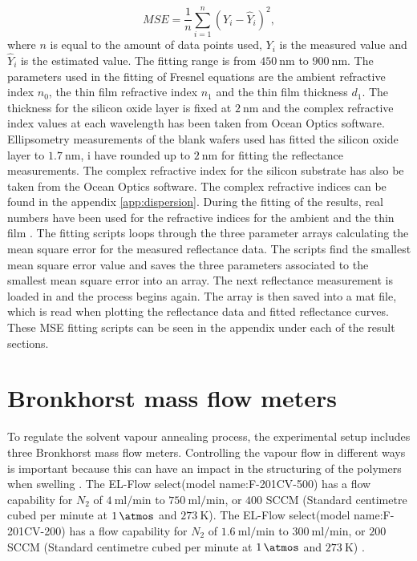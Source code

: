 \documentclass[MasterThesisMain.tex]{subfiles}
\begin{document}
\begin{equation}
MSE = \frac{1}{n}\sum_{i=1}^{n}\left( Y_i - \hat{Y}_i \right)^2,
\end{equation} 
where $n$ is equal to the amount of data points used, $Y_i$ is the measured value and $\hat{Y}_i$ is the estimated value. The fitting range is from $\SI{450}{\nano\meter}$ to $\SI{900}{\nano\meter}$. The parameters used in the fitting of Fresnel equations are the ambient refractive index $n_0$, the thin film refractive index $n_1$ and the thin film thickness $d_1$. The thickness for the silicon oxide layer is fixed at $\SI{2}{\nano\meter}$ and the complex refractive index values at each wavelength has been taken from Ocean Optics software. Ellipsometry measurements of the blank wafers used has fitted the silicon oxide layer to $\SI{1.7}{\nano\meter}$, i have rounded up to $\SI{2}{\nano\meter}$ for fitting the reflectance measurements. The complex refractive index for the silicon substrate has also be taken from the Ocean Optics software. The complex refractive indices can be found in the appendix \ref{app:dispersion}. During the fitting of the results, real numbers have been used for the refractive indices for the ambient and the thin film . The fitting scripts loops through the three parameter arrays calculating the mean square error for the measured reflectance data. The scripts find the smallest mean square error value and saves the three parameters associated to the smallest mean square error into an array. The next reflectance measurement is loaded in and the process begins again. The array is then saved into a mat file, which is read when plotting the reflectance data and fitted reflectance curves. These MSE fitting scripts can be seen in the appendix under each of the result sections.

\section{Bronkhorst mass flow meters}
To regulate the solvent vapour annealing process, the experimental setup includes three Bronkhorst mass flow meters. Controlling the vapour flow in different ways is important because this can have an impact in the structuring of the polymers when swelling \cite{SVABCP}. The EL-Flow select(model name:F-201CV-500) has a flow capability for $N_2$ of $\SI{4}{\milli\litre\per\minute}$ to $\SI{750}{\milli\litre\per\minute}$, or $400$ SCCM (Standard centimetre cubed per minute at $\SI{1}{\atmos}$ and $\SI{273}{\kelvin}$). The EL-Flow select(model name:F-201CV-200) has a flow capability for $N_2$ of $\SI{1.6}{\milli\litre\per\minute}$ to $\SI{300}{\milli\litre\per\minute}$, or $200$ SCCM (Standard centimetre cubed per minute at $\SI{1}{\atmos}$ and $\SI{273}{\kelvin}$) \cite{elflow}.
\end{document}
